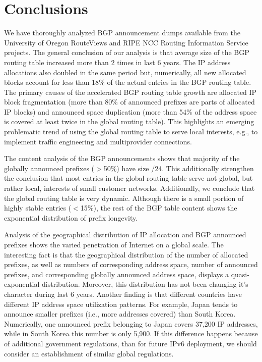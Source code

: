 \section{Conclusions}
\label{sec:conclusions}

We have thoroughly analyzed BGP announcement dumps available from the University
of Oregon RouteViews and RIPE NCC Routing Information Service projects. The
general conclusion of our analysis is that average size of the BGP routing
table increased more than 2 times in last 6 years. The IP address allocations
also doubled in the same period but, numerically, all new allocated blocks
account for less than 18\% of the actual entries in the BGP routing table. The
primary causes of the accelerated BGP routing table growth are allocated IP
block fragmentation (more than 80\% of announced prefixes are parts of
allocated IP blocks) and announced space duplication (more than 54\% of the
address space is covered at least twice in the global routing table). This
highlights an emerging problematic trend of using the global routing table to
serve local interests, e.g., to implement traffic engineering and multiprovider 
connections.

The content analysis of the BGP announcements shows that majority of the
globally announced prefixes ($>$50\%) have size /24. This additionally
strengthen the conclusion that most entries in the global routing table serve not
global, but rather local, interests of small customer networks. Additionally, we
conclude that the global routing table is very dynamic. Although there is a
small portion of highly stable entries ($<$15\%), the rest of the BGP table
content shows the exponential distribution of prefix longevity.

Analysis of the geographical distribution of IP allocation and BGP announced
prefixes shows the varied penetration of Internet on a global scale. The
interesting fact is that the geographical distribution of the number of allocated
prefixes, as well as numbers of corresponding address space, number of
announced prefixes, and corresponding globally announced address space,
displays a quasi-exponential distribution. Moreover, this distribution has not
been changing it's character during last 6 years. Another finding is that
different countries have different IP address space utilization patterns. For
example, Japan tends to announce smaller prefixes (i.e., more addresses
covered) than South Korea. Numerically, one announced prefix belonging to
Japan covers 37,200 IP addresses, while in South Korea this number is only
5,900. If this difference happens because of additional government
regulations, than for future IPv6 deployment, we should consider an
establishment of similar global regulations.
